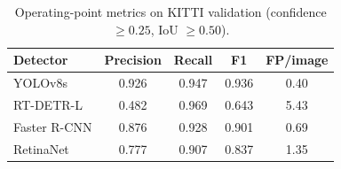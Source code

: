 \begin{table}[t]
    \centering
    \caption{Operating-point metrics on KITTI validation (confidence $\geq 0.25$, IoU $\geq 0.50$).}
    \label{tab:operating_point}
    \begin{tabular}{lcccc}
        \toprule
        Detector & Precision & Recall & F1 & FP/image \\
        \midrule
        YOLOv8s & 0.926 & 0.947 & 0.936 & 0.40 \\
        RT-DETR-L & 0.482 & 0.969 & 0.643 & 5.43 \\
        Faster R-CNN & 0.876 & 0.928 & 0.901 & 0.69 \\
        RetinaNet & 0.777 & 0.907 & 0.837 & 1.35 \\
        \bottomrule
    \end{tabular}
\end{table}
